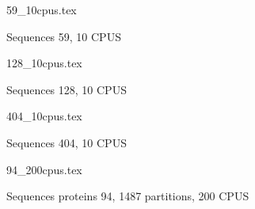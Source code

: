 \documentclass[12pt,a4paper]{article}
\begin{document}
\begin{figure}
\caption*{Sequences 59, 10 CPUS}
{59_10cpus.tex}
\end{figure}

\begin{figure}
\caption*{Sequences 128, 10 CPUS}
{128_10cpus.tex}
\end{figure}

\begin{figure}
\caption*{Sequences 404, 10 CPUS}
{404_10cpus.tex}
\end{figure}

\begin{figure}
\caption*{Sequences proteins 94, 1487 partitions, 200 CPUS}
{94_200cpus.tex}
\end{figure}
\end{document}
